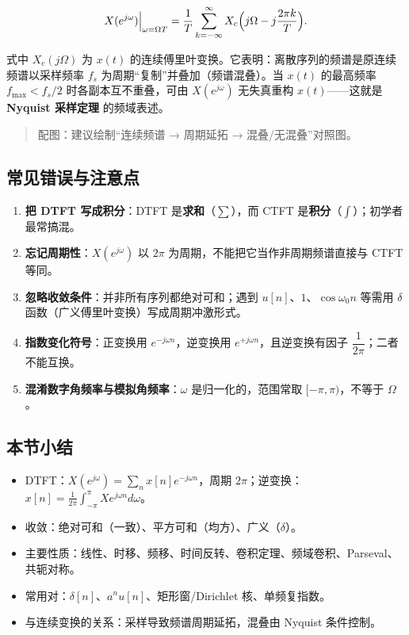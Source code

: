 \[
X(e^{j\omega}) \Big|_{\omega=\Omega T}
= \frac{1}{T}\sum_{k=-\infty}^{\infty} X_c\Bigl(j\Omega-j\frac{2\pi k}{T}\Bigr).
\]

式中 \(X_c(j\Omega)\) 为 \(x(t)\)
的连续傅里叶变换。它表明：离散序列的频谱是原连续频谱以采样频率 \(f_s\)
为周期``复制''并叠加（频谱混叠）。当 \(x(t)\) 的最高频率
\(f_{\max}<f_s/2\) 时各副本互不重叠，可由 \(X(e^{j\omega})\) 无失真重构
\(x(t)\)------这就是 \textbf{Nyquist 采样定理} 的频域表述。

\begin{quote}
配图：建议绘制``连续频谱 → 周期延拓 → 混叠/无混叠''对照图。
\end{quote}

\subsection{常见错误与注意点}\label{ux5e38ux89c1ux9519ux8befux4e0eux6ce8ux610fux70b9-25}

\begin{enumerate}
\def\labelenumi{\arabic{enumi}.}
\tightlist
\item
  \textbf{把 DTFT 写成积分}：DTFT 是\textbf{求和}（\(\sum\)），而 CTFT
  是\textbf{积分}（\(\int\)）；初学者最常搞混。
\item
  \textbf{忘记周期性}：\(X(e^{j\omega})\) 以 \(2\pi\)
  为周期，不能把它当作非周期频谱直接与 CTFT 等同。
\item
  \textbf{忽略收敛条件}：并非所有序列都绝对可和；遇到
  \(u[n]\)、\(1\)、\(\cos\omega_0 n\) 等需用 \(\delta\)
  函数（广义傅里叶变换）写成周期冲激形式。
\item
  \textbf{指数变化符号}：正变换用 \(e^{-j\omega n}\)，逆变换用
  \(e^{+j\omega n}\)，且逆变换有因子 \(\dfrac{1}{2\pi}\)；二者不能互换。
\item
  \textbf{混淆数字角频率与模拟角频率}：\(\omega\) 是归一化的，范围常取
  \([-\pi,\pi)\)，不等于 \(\Omega\)。
\end{enumerate}

\subsection{本节小结}\label{ux672cux8282ux5c0fux7ed3-25}

\begin{itemize}
\tightlist
\item
  DTFT：\(X(e^{j\omega})=\sum_n x[n]e^{-j\omega n}\)，周期
  \(2\pi\)；逆变换：\(x[n]=\frac{1}{2\pi}\int_{-\pi}^{\pi}X e^{j\omega n}d\omega\)。
\item
  收敛：绝对可和（一致）、平方可和（均方）、广义（\(\delta\)）。
\item
  主要性质：线性、时移、频移、时间反转、卷积定理、频域卷积、Parseval、共轭对称。
\item
  常用对：\(\delta[n]\)、\(a^n u[n]\)、矩形窗/Dirichlet 核、单频复指数。
\item
  与连续变换的关系：采样导致频谱周期延拓，混叠由 Nyquist 条件控制。
\end{itemize}

